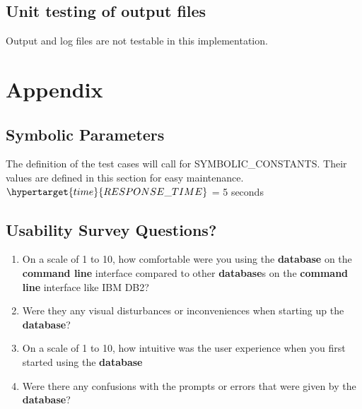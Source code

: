 \documentclass[12pt, titlepage]{article}
\begin{document}
\subsection{Unit testing of output files}	
Output and log files are not testable in this implementation.





\newpage

\section{Appendix}

\subsection{Symbolic Parameters}

The definition of the test cases will call for SYMBOLIC\_CONSTANTS.
Their values are defined in this section for easy maintenance.\\

\noindent $\hypertarget{time}{RESPONSE\_TIME}$ = 5 seconds

\subsection{Usability Survey Questions?}

\begin{enumerate}
    \item On a scale of 1 to 10, how comfortable were you using the \textbf{database} on the \textbf{command line} interface compared to other \textbf{database}s on the \textbf{command line} interface like IBM DB2?
    
    \item Were they any visual disturbances or inconveniences when starting up the \textbf{database}? 
    
    \item On a scale of 1 to 10, how intuitive was the user experience when you first started using the \textbf{database}
    
    \item Were there any confusions with the prompts or errors that were given by the \textbf{database}?
    
\end{enumerate}
\end{document}
